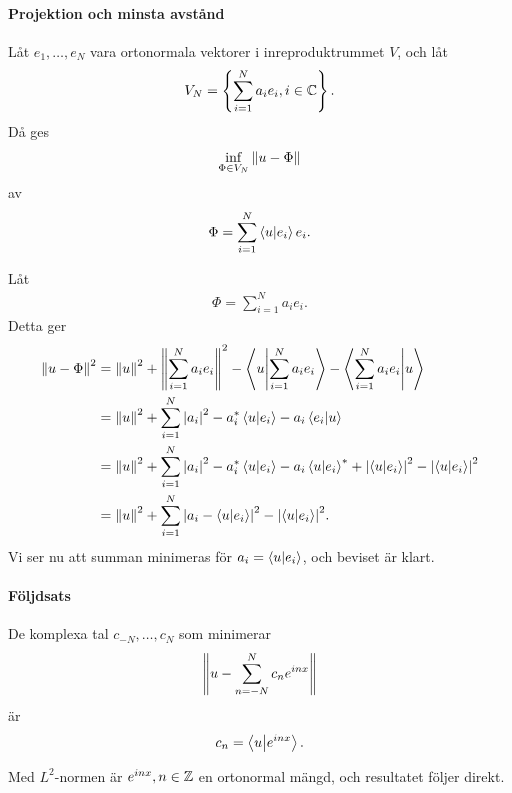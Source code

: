 \paragraph{Projektion och minsta avstånd}
Låt $e_{1}, \dots, e_{N}$ vara ortonormala vektorer i inreproduktrummet $V$, och låt
\begin{align*}
	V_{N} = \left\{\sum\limits_{i = 1}^{N}a_{i}e_{i}, i\in\mathbb{C}\right\}.
\end{align*}
Då ges
\begin{align*}
	\inf\limits_{\Phi\in V_{N}}\norm{u - \Phi}
\end{align*}
av
\begin{align*}
	\Phi = \sum\limits_{i = 1}^{N}\bra{u}\ket{e_{i}}e_{i}.
\end{align*}

\proof
Låt
\begin{align*}
	\Phi = \sum\limits_{i = 1}^{N}a_{i}e_{i}.
\end{align*}
Detta ger
\begin{align*}
	\norm{u - \Phi}^{2} &= \norm{u}^{2} + \norm{\sum\limits_{i = 1}^{N}a_{i}e_{i}}^{2} - \bra{u}\ket{\sum\limits_{i = 1}^{N}a_{i}e_{i}} - \bra{\sum\limits_{i = 1}^{N}a_{i}e_{i}}\ket{u} \\
	                    &= \norm{u}^{2} + \sum\limits_{i = 1}^{N}\abs{a_{i}}^{2} - a_{i}^{*}\bra{u}\ket{e_{i}} - a_{i}\bra{e_{i}}\ket{u} \\
	                    &= \norm{u}^{2} + \sum\limits_{i = 1}^{N}\abs{a_{i}}^{2} - a_{i}^{*}\bra{u}\ket{e_{i}} - a_{i}\bra{u}\ket{e_{i}}^{*} + \abs{\bra{u}\ket{e_{i}}}^{2} - \abs{\bra{u}\ket{e_{i}}}^{2} \\
	                    &= \norm{u}^{2} + \sum\limits_{i = 1}^{N}\abs{a_{i} - \bra{u}\ket{e_{i}}}^{2} - \abs{\bra{u}\ket{e_{i}}}^{2}.
\end{align*}
Vi ser nu att summan minimeras för $a_{i} = \bra{u}\ket{e_{i}}$, och beviset är klart.

\paragraph{Följdsats}
De komplexa tal $c_{-N}, \dots, c_{N}$ som minimerar
\begin{align*}
	\norm{u - \sum\limits_{n = -N}^{N}c_{n}e^{inx}}
\end{align*}
är
\begin{align*}
	c_{n} = \bra{u}\ket{e^{inx}}.
\end{align*}

\proof
Med $L^{2}$-normen är $e^{inx}, n\in\mathbb{Z}$ en ortonormal mängd, och resultatet följer direkt.

